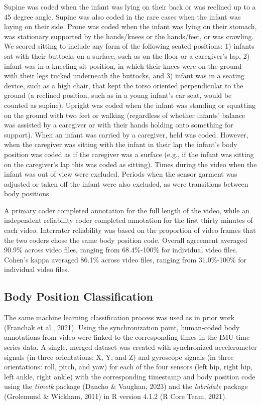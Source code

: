 \documentclass[
  man]{apa6}
\begin{document}
Supine was coded when the infant was lying on their back or was reclined up to a 45 degree angle. Supine was also coded in the rare cases when the infant was laying on their side. Prone was coded when the infant was lying on their stomach, was stationary supported by the hands/knees or the hands/feet, or was crawling. We scored sitting to include any form of the following seated positions: 1) infants sat with their buttocks on a surface, such as on the floor or a caregiver's lap, 2) infant was in a kneeling-sit position, in which their knees were on the ground with their legs tucked underneath the buttocks, and 3) infant was in a seating device, such as a high chair, that kept the torso oriented perpendicular to the ground (a reclined position, such as in a young infant's car seat, would be counted as supine). Upright was coded when the infant was standing or squatting on the ground with two feet or walking (regardless of whether infants' balance was assisted by a caregiver or with their hands holding onto something for support). When an infant was carried by a caregiver, held was coded. However, when the caregiver was sitting with the infant in their lap the infant's body position was coded as if the caregiver was a surface (e.g., if the infant was sitting on the caregiver's lap this was coded as sitting). Times during the video when the infant was out of view were excluded. Periods when the sensor garment was adjusted or taken off the infant were also excluded, as were transitions between body positions.

A primary coder completed annotation for the full length of the video, while an independent reliability coder completed annotation for the first thirty minutes of each video. Interrater reliability was based on the proportion of video frames that the two coders chose the same body position code. Overall agreement averaged 90.9\% across video files, ranging from 68.4\%-100\% for individual video files. Cohen's kappa averaged 86.1\% across video files, ranging from 31.0\%-100\% for individual video files.

\hypertarget{body-position-classification}{%
\subsection{Body Position Classification}\label{body-position-classification}}

The same machine learning classification process was used as in prior work (Franchak et al., 2021). Using the synchronization point, human-coded body annotations from video were linked to the corresponding times in the IMU time series data. A single, merged dataset was created with synchronized accelerometer signals (in three orientations: X, Y, and Z) and gyroscope signals (in three orientations: roll, pitch, and yaw) for each of the four sensors (left hip, right hip, left ankle, right ankle) with the corresponding timestamp and body position code using the \emph{timetk} package (Dancho \& Vaughan, 2023) and the \emph{lubridate} package (Grolemund \& Wickham, 2011) in R version 4.1.2 (R Core Team, 2021).
\end{document}
